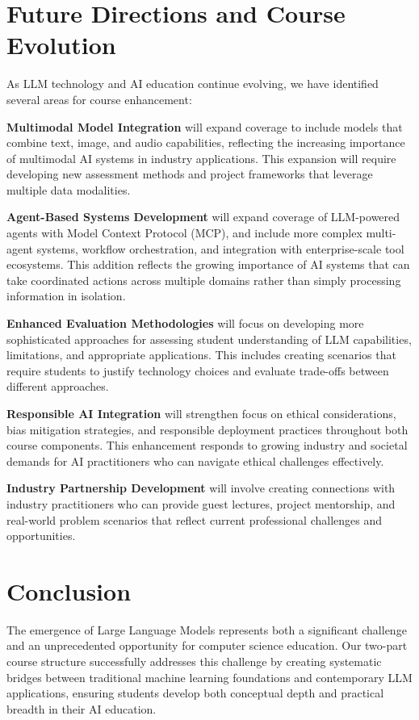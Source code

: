 \documentclass{article}
\begin{document}
\section{Future Directions and Course Evolution}

As LLM technology and AI education continue evolving, we have identified several areas for course enhancement:

\textbf{Multimodal Model Integration} will expand coverage to include models that combine text, image, and audio capabilities, reflecting the increasing importance of multimodal AI systems in industry applications. This expansion will require developing new assessment methods and project frameworks that leverage multiple data modalities.

\textbf{Agent-Based Systems Development} will expand coverage of LLM-powered agents with Model Context Protocol (MCP), and include more complex multi-agent systems, workflow orchestration, and integration with enterprise-scale tool ecosystems. This addition reflects the growing importance of AI systems that can take coordinated actions across multiple domains rather than simply processing information in isolation.

\textbf{Enhanced Evaluation Methodologies} will focus on developing more sophisticated approaches for assessing student understanding of LLM capabilities, limitations, and appropriate applications. This includes creating scenarios that require students to justify technology choices and evaluate trade-offs between different approaches.

\textbf{Responsible AI Integration} will strengthen focus on ethical considerations, bias mitigation strategies, and responsible deployment practices throughout both course components. This enhancement responds to growing industry and societal demands for AI practitioners who can navigate ethical challenges effectively.

\textbf{Industry Partnership Development} will involve creating connections with industry practitioners who can provide guest lectures, project mentorship, and real-world problem scenarios that reflect current professional challenges and opportunities.

\section{Conclusion}

The emergence of Large Language Models represents both a significant challenge and an unprecedented opportunity for computer science education. Our two-part course structure successfully addresses this challenge by creating systematic bridges between traditional machine learning foundations and contemporary LLM applications, ensuring students develop both conceptual depth and practical breadth in their AI education.
\end{document}
